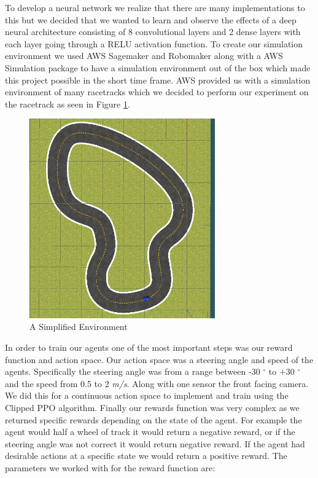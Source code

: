 \documentclass[journal]{IEEEtran}
\begin{document}
To develop a neural network we realize that there are many implementations to this but we decided that we wanted to learn and observe the effects of a deep neural architecture consisting of 8 convolutional layers and 2 dense layers with each layer going through a RELU activation function.  To create our simulation environment we used AWS Sagemaker and Robomaker along with a AWS Simulation package to have a simulation environment out of the box which made this project possible in the short time frame.  AWS provided us with a simulation environment of many racetracks which we decided to perform our experiment on the racetrack as seen in Figure \ref{reinvent}.

\begin{figure}[htbp]
\begin{center}
\includegraphics[width=8cm]{training_track}
\end{center}
\vspace{-2mm}
\caption{A Simplified Environment}
\label{reinvent}
\end{figure}

In order to train our agents one of the most important steps was our reward function and action space.  Our action space was a steering angle and speed of the agents.  Specifically the steering angle was from a range between -30 $^{\circ}$ to +30 $^{\circ}$ and the speed from 0.5 to 2 \emph{m/s}.  Along with one sensor the front facing camera.  We did this for a continuous action space to implement and train using the Clipped PPO algorithm.  Finally our rewards function was very complex as we returned specific rewards depending on the state of the agent.  For example the agent would half a wheel of track it would return a negative reward, or if the steering angle was not correct it would return negative reward.  If the agent had desirable actions at a specific state we would return a positive reward.  The parameters we worked with for the reward function are:
\end{document}

